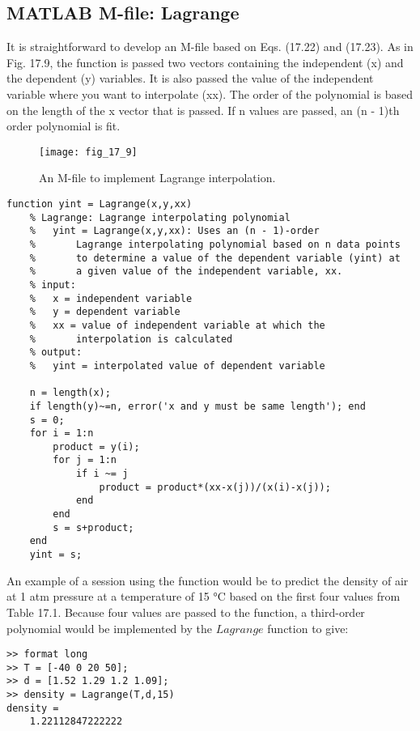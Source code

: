 \documentclass[../main.tex]{subfiles}
\begin{document}
\subsection{MATLAB M-file: Lagrange}
It is straightforward to develop an M-file based on Eqs. (17.22) and (17.23). As in
Fig. 17.9, the function is passed two vectors containing the independent (x) and the
dependent (y) variables. It is also passed the value of the independent variable where you
want to interpolate (xx). The order of the polynomial is based on the length of the x vector
that is passed. If n values are passed, an (n - 1)th order polynomial is fit. 

\begin{figure}[H]
    \centering
    \texttt{[image: fig\_17\_9]}
   \caption{\textsf{An M-file to implement Lagrange interpolation.}}\label{fig:fig_17_9}
\end{figure}

\begin{lstlisting}[numbers=none]
    function yint = Lagrange(x,y,xx)
    % Lagrange: Lagrange interpolating polynomial
    %   yint = Lagrange(x,y,xx): Uses an (n - 1)-order
    %       Lagrange interpolating polynomial based on n data points
    %       to determine a value of the dependent variable (yint) at
    %       a given value of the independent variable, xx.
    % input:
    %   x = independent variable
    %   y = dependent variable
    %   xx = value of independent variable at which the
    %       interpolation is calculated
    % output:
    %   yint = interpolated value of dependent variable

    n = length(x);
    if length(y)~=n, error('x and y must be same length'); end
    s = 0;
    for i = 1:n
        product = y(i);
        for j = 1:n
            if i ~= j
                product = product*(xx-x(j))/(x(i)-x(j));
            end
        end
        s = s+product;
    end
    yint = s;
\end{lstlisting}

An example of a session using the function would be to predict the density of air at
1 atm pressure at a temperature of 15 °C based on the first four values from Table 17.1.
Because four values are passed to the function, a third-order polynomial would be implemented by the $Lagrange$ function to give:

\begin{lstlisting}[numbers=none]
>> format long
>> T = [-40 0 20 50];
>> d = [1.52 1.29 1.2 1.09];
>> density = Lagrange(T,d,15)
density =
    1.22112847222222
\end{lstlisting}
\end{document}
